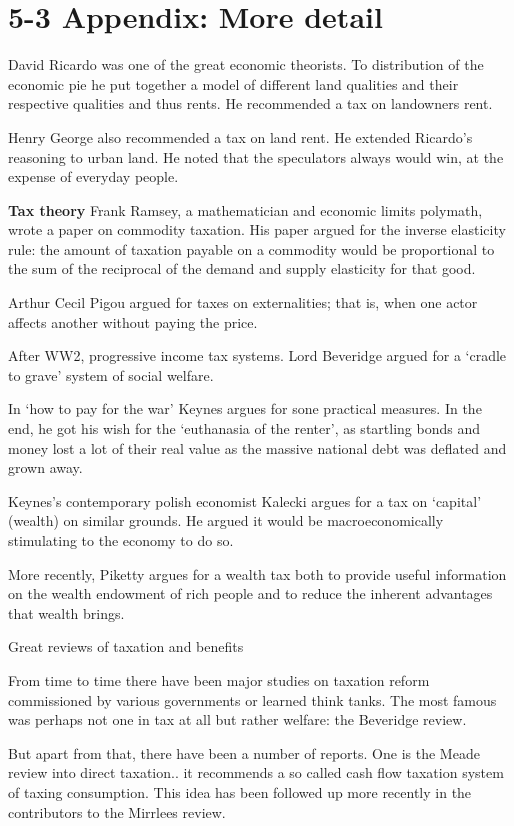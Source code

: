 \documentclass[]{tufte-handout}
\begin{document}
\hypertarget{appendix-more-detail}{%
\section{5-3 Appendix: More detail}\label{appendix-more-detail}}

David Ricardo was one of the great economic theorists. To distribution
of the economic pie he put together a model of different land qualities
and their respective qualities and thus rents. He recommended a tax on
landowners rent.

Henry George also recommended a tax on land rent. He extended Ricardo's
reasoning to urban land. He noted that the speculators always would win,
at the expense of everyday people.

\textbf{Tax theory} Frank Ramsey, a mathematician and economic limits
polymath, wrote a paper on commodity taxation. His paper argued for the
inverse elasticity rule: the amount of taxation payable on a commodity
would be proportional to the sum of the reciprocal of the demand and
supply elasticity for that good.

Arthur Cecil Pigou argued for taxes on externalities; that is, when one
actor affects another without paying the price.

After WW2, progressive income tax systems. Lord Beveridge argued for a
`cradle to grave' system of social welfare.

In `how to pay for the war' Keynes argues for sone practical measures.
In the end, he got his wish for the `euthanasia of the renter', as
startling bonds and money lost a lot of their real value as the massive
national debt was deflated and grown away.

Keynes's contemporary polish economist Kalecki argues for a tax on
`capital' (wealth) on similar grounds. He argued it would be
macroeconomically stimulating to the economy to do so.

More recently, Piketty argues for a wealth tax both to provide useful
information on the wealth endowment of rich people and to reduce the
inherent advantages that wealth brings.

Great reviews of taxation and benefits

From time to time there have been major studies on taxation reform
commissioned by various governments or learned think tanks. The most
famous was perhaps not one in tax at all but rather welfare: the
Beveridge review.

But apart from that, there have been a number of reports. One is the
Meade review into direct taxation.. it recommends a so called cash flow
taxation system of taxing consumption. This idea has been followed up
more recently in the contributors to the Mirrlees review.
\end{document}

